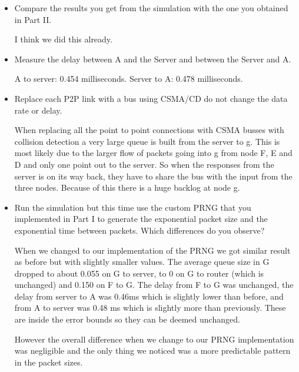 \documentclass{article}
\begin{document}
\begin{itemize}
\begin{itemize}
\begin{addmargin}[1em]{2em}
        \end{addmargin}
    \end{itemize}
    
    \item Compare the results you get from the simulation with the one you obtained in Part II.
    \begin{addmargin}[1em]{2em}
    I think we did this already.
    \end{addmargin}
    
    \item Measure the delay between A and the Server and between the Server and A.
    \begin{addmargin}[1em]{2em}
    A to server: 0.454 milliseconds.
    Server to A: 0.478 milliseconds.
    \end{addmargin}
    
    \item Replace each P2P link with a bus using CSMA/CD do not change the data rate or delay.
    \begin{addmargin}[1em]{2em}
    When replacing all the point to point connections with CSMA busses with collision detection a very large queue is built from the server to g. This is most likely due to the larger flow of packets going into g from node F, E and D and only one point out to the server. So when the responses from the server is on its way back, they have to share the bus with the input from the three nodes. Because of this there is a huge backlog at node g. 
    \end{addmargin}
    
    \item Run the simulation but this time use the custom PRNG that you implemented in Part I to generate the exponential packet size and the exponential time between packets. Which differences do you observe?
    \begin{addmargin}[1em]{2em}
    When we changed to our implementation of the PRNG we got similar result as before but with slightly smaller values. The average queue size in G dropped to about 0.055 on G to server, to 0 on G to router (which is unchanged) and 0.150 on F to G. The delay from F to G was unchanged, the delay from server to A was 0.46ms which is slightly lower than before, and from A to server was 0.48 ms which is slightly more than previously. These are inside the error bounds so they can be deemed unchanged. 
    
    However the overall difference when we change to our PRNG implementation was negligible and the only thing we noticed was a more predictable pattern in the packet sizes.
    \end{addmargin}
\end{itemize}
\end{document}
